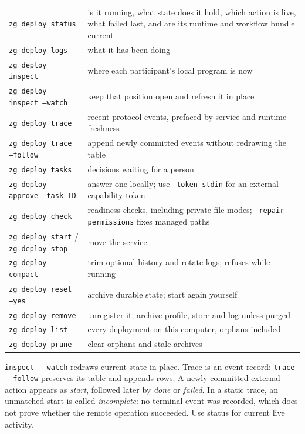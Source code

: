 \documentclass[11pt,a4paper]{article}
\begin{document}
\begin{center}
\begin{tabularx}{0.95\linewidth}{@{}lX@{}}
\toprule
\texttt{zg deploy status} & is it running, what state does it hold, which action is live, what failed last, and are its runtime and workflow bundle current \\
\texttt{zg deploy logs} & what it has been doing \\
\texttt{zg deploy inspect} & where each participant's local program is now \\
\texttt{zg deploy inspect --watch} & keep that position open and refresh it in place \\
\texttt{zg deploy trace} & recent protocol events, prefaced by service and runtime freshness \\
\texttt{zg deploy trace --follow} & append newly committed events without redrawing the table \\
\texttt{zg deploy tasks} & decisions waiting for a person \\
\texttt{zg deploy approve --task ID} & answer one locally; use \texttt{--token-stdin} for an external capability token \\
\texttt{zg deploy check} & readiness checks, including private file modes; \texttt{--repair-permissions} fixes managed paths \\
\texttt{zg deploy start} / \texttt{zg deploy stop} & move the service \\
\texttt{zg deploy compact} & trim optional history and rotate logs; refuses while running \\
\texttt{zg deploy reset --yes} & archive durable state; start again yourself \\
\texttt{zg deploy remove} & unregister it; archive profile, store and log unless purged \\
\texttt{zg deploy list} & every deployment on this computer, orphans included \\
\texttt{zg deploy prune} & clear orphans and stale archives \\
\bottomrule
\end{tabularx}
\end{center}

\texttt{inspect -{}-watch} redraws current state in place. Trace is an event
record: \texttt{trace -{}-follow} preserves its table and appends rows. A newly
committed external action appears as \emph{start}, followed later by
\emph{done} or \emph{failed}. In a static trace, an unmatched start is called
\emph{incomplete}: no terminal event was recorded, which does not prove whether
the remote operation succeeded. Use status for current live activity.
\end{document}
